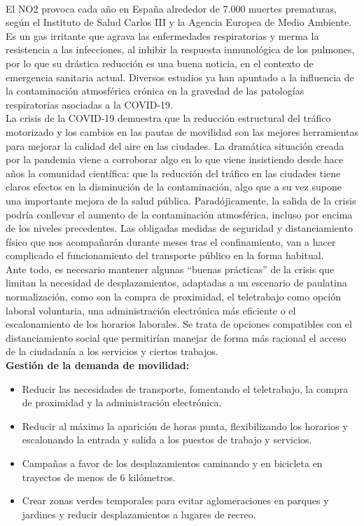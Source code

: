 \documentclass[a4paper,11pt]{article}
\begin{document}
\\ El NO2 provoca cada año en España alrededor de 7.000 muertes prematuras, según el Instituto
de Salud Carlos III y la Agencia Europea de Medio Ambiente. Es un gas irritante que agrava
las enfermedades respiratorias y merma la resistencia a las infecciones, al inhibir la respuesta
inmunológica de los pulmones, por lo que su drástica reducción es una buena noticia, en el
contexto de emergencia sanitaria actual. Diversos estudios ya han apuntado a la influencia de
la contaminación atmosférica crónica en la gravedad de las patologías respiratorias asociadas
a la COVID-19.
\\ La crisis de la COVID-19 demuestra que la reducción estructural del tráfico motorizado y los
cambios en las pautas de movilidad son las mejores herramientas para mejorar la calidad del
aire en las ciudades. La dramática situación creada por la pandemia viene a corroborar algo en
lo que viene insistiendo desde hace años la comunidad científica: que la reducción del tráfico
en las ciudades tiene claros efectos en la disminución de la contaminación, algo que a su vez
supone una importante mejora de la salud pública.
Paradójicamente, la salida de la crisis podría conllevar el aumento de la contaminación atmosférica,
incluso por encima de los niveles precedentes. Las obligadas medidas de seguridad
y distanciamiento físico que nos acompañarán durante meses tras el confinamiento, van a hacer
complicado el funcionamiento del transporte público en la forma habitual.
\\ Ante todo, es necesario mantener algunas “buenas prácticas” de la crisis que limitan la necesidad
de desplazamientos, adaptadas a un escenario de paulatina normalización, como son
la compra de proximidad, el teletrabajo como opción laboral voluntaria, una administración
electrónica más eficiente o el escalonamiento de los horarios laborales. Se trata de opciones
compatibles con el distanciamiento social que permitirían manejar de forma más racional el
acceso de la ciudadanía a los servicios y ciertos trabajos.
\textbf{\\ Gestión de la demanda de movilidad:}
\begin{itemize}
\item Reducir las necesidades de transporte, fomentando el teletrabajo, la compra de proximidad
y la administración electrónica.
\item Reducir al máximo la aparición de horas punta, flexibilizando los horarios y escalonando
la entrada y salida a los puestos de trabajo y servicios.
\item Campañas a favor de los desplazamientos caminando y en bicicleta en trayectos de
menos de 6 kilómetros.
\item Crear zonas verdes temporales para evitar aglomeraciones en parques y jardines y reducir
desplazamientos a lugares de recreo.
\end{itemize}
\end{document}
